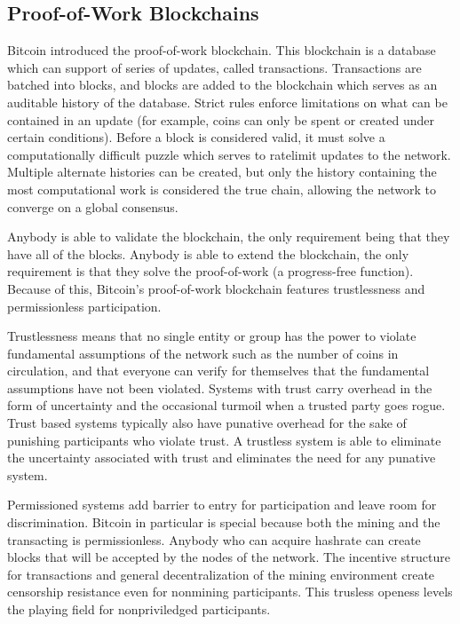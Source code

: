 \documentclass[onecolumn]{article}
\begin{document}
\subsection{Proof-of-Work Blockchains}
Bitcoin \cite{bitcoin} introduced the proof-of-work blockchain.
This blockchain is a database which can support of series of updates, called transactions.
Transactions are batched into blocks, and blocks are added to the blockchain which serves as an auditable history of the database.
Strict rules enforce limitations on what can be contained in an update (for example, coins can only be spent or created under certain conditions).
Before a block is considered valid, it must solve a computationally difficult puzzle which serves to ratelimit updates to the network.
Multiple alternate histories can be created, but only the history containing the most computational work is considered the true chain, allowing the network to converge on a global consensus.

Anybody is able to validate the blockchain, the only requirement being that they have all of the blocks.
Anybody is able to extend the blockchain, the only requirement is that they solve the proof-of-work (a progress-free function).
Because of this, Bitcoin's proof-of-work blockchain features trustlessness and permissionless participation.

Trustlessness means that no single entity or group has the power to violate fundamental assumptions of the network such as the number of coins in circulation,
and that everyone can verify for themselves that the fundamental assumptions have not been violated.
Systems with trust carry overhead in the form of uncertainty and the occasional turmoil when a trusted party goes rogue.
Trust based systems typically also have punative overhead for the sake of punishing participants who violate trust.
A trustless system is able to eliminate the uncertainty associated with trust and eliminates the need for any punative system.

Permissioned systems add barrier to entry for participation and leave room for discrimination.
Bitcoin in particular is special because both the mining and the transacting is permissionless.
Anybody who can acquire hashrate can create blocks that will be accepted by the nodes of the network.
The incentive structure for transactions and general decentralization of the mining environment create censorship resistance even for nonmining participants.
This trusless openess levels the playing field for nonpriviledged participants.
\end{document}
